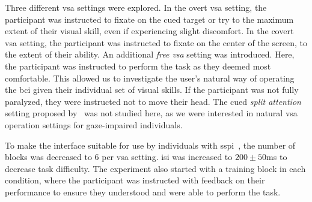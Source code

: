 Three different \ac{vsa} settings were explored.
In the overt \ac{vsa} setting, the participant was instructed to fixate on the cued target or
try to the maximum extent of their visual skill, even if experiencing slight
discomfort.
In the covert \ac{vsa} setting, the participant was instructed to fixate on the center of the
screen, to the extent of their ability.
An additional \emph{free \ac{vsa}} setting was introduced.
Here, the participant was instructed to perform the task as they deemed most
comfortable.
This allowed us to investigate the user's natural way of operating the \ac{bci}
given their individual set of visual skills.
If the participant was not fully paralyzed, they were instructed not to move their head.
The cued \emph{split attention} setting proposed
by~\textcite{VanDenKerchove2024} was not studied here, as we were interested
in natural \ac{vsa} operation settings for gaze-impaired individuals.

To make the interface suitable for use by individuals with
\ac{sspi}~\cite{FriedOken2020}, the
number of blocks was decreased to 6 per \ac{vsa} setting.
\Ac{isi} was increased to $200\pm50$ms to decrease task difficulty.
The experiment also started with a training block in each condition, where the
participant was instructed with feedback on their performance to ensure they
understood and were able to perform the task.

